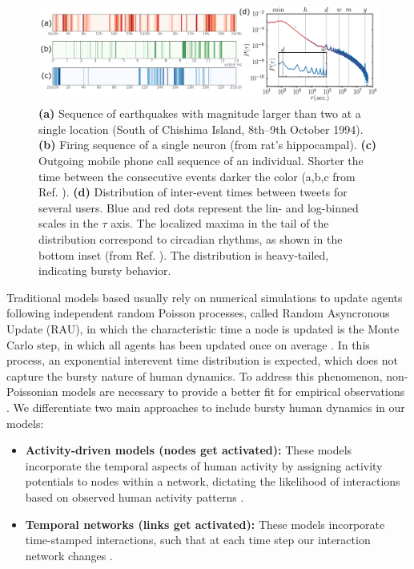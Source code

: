 \begin{figure}
    \centering
    \captionsetup{font=sf}
    \includegraphics[width=\textwidth]{Figs/Introduction/bursty.png}
    \caption[Bursty human dynamics: examples and distribution]{\textbf{(a)} Sequence of earthquakes with magnitude larger than two at a single location (South of Chishima Island, 8th–9th October 1994). \textbf{(b)} Firing sequence of a single neuron (from rat's hippocampal). \textbf{(c)} Outgoing mobile phone call sequence of an individual. Shorter the time between the consecutive events darker the color (a,b,c from Ref. \cite{karsai2012universal}). \textbf{(d)} Distribution of inter-event times between tweets for several users. Blue and red dots represent the lin- and log-binned scales in the $\tau$ axis. The localized maxima in the tail of the distribution correspond to circadian rhythms, as shown in the bottom inset  (from Ref. \cite{artime-2017}). The distribution is heavy-tailed, indicating bursty behavior.}
    \label{fig:bursty_human_dynamics}
\end{figure}

Traditional models based usually rely on numerical simulations to update agents following independent random Poisson processes, called Random Asyncronous Update (RAU), in which the characteristic time a node is updated is the Monte Carlo step, in which all agents has been updated once on average \cite{fernandez-gracia-2011}. In this process, an exponential interevent time distribution is expected, which does not capture the bursty nature of human dynamics. To address this phenomenon, non-Poissonian models are necessary to provide a better fit for empirical observations \cite{Vazquez2006Bursts}. We differentiate two main approaches to include bursty human dynamics in our models:

\begin{itemize}
    \item \textbf{Activity-driven models (nodes get activated):} These models incorporate the temporal aspects of human activity by assigning activity potentials to nodes within a network, dictating the likelihood of interactions based on observed human activity patterns \cite{Stark2008,van-mieghem-2013,starnini-2017}.
    \item \textbf{Temporal networks (links get activated):} These models incorporate time-stamped interactions, such that at each time step our interaction network changes \cite{Holme2012Temporal, Perra2012ActivityDriven}.
\end{itemize}

